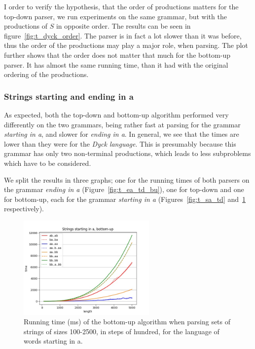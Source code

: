 I order to verify the hypothesis, that the order of productions matters for the top-down parser, we run experiments on the same grammar, but with the productions of $S$ in opposite order.
The results can be seen in figure~\ref{fig:t_dyck_order}.
The parser is in fact a lot slower than it was before, thus the order of the productions may play a major role, when parsing.
The plot further shows that the order does not matter that much for the bottom-up parser.
It has almost the same running time, than it had with the original ordering of the productions.

\subsubsection{Strings starting and ending in a}

As expected, both the top-down and bottom-up algorithm performed very differently on the two grammars, being rather fast at parsing for the grammar \textit{starting in a}, and slower for \textit{ending in a}.
In general, we see that the times are lower than they were for the \textit{Dyck language}.
This is presumably because this grammar has only two non-terminal productions, which leads to less subproblems which have to be considered.

We split the results in three graphs; one for the running times of both parsers on the grammar \textit{ending in a} (Figure~\ref{fig:t_ea_td_bu}), one for top-down and one for bottom-up, each for the grammar \textit{starting in a} (Figures~\ref{fig:t_sa_td} and~\ref{fig:t_sa_bu} respectively).

\begin{figure}[!ht]
    \centering
    \includegraphics[width=0.6\textwidth]{Resources/t_sa_bu.jpg}
    \caption{Running time (ms) of the bottom-up algorithm when parsing sets of strings of sizes 100-2500, in steps of hundred, for the language of words starting in a.}
    \label{fig:t_sa_bu}
\end{figure}

